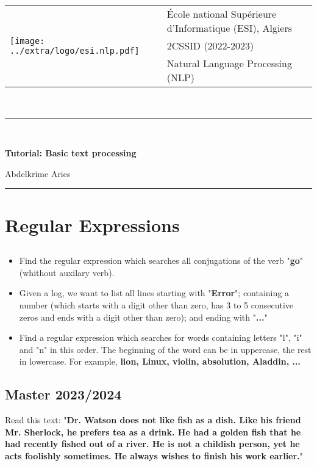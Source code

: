 \documentclass[11pt, a4paper]{article}
\begin{document}

\noindent
\begin{tabular}{ll}
\multirow{3}{*}{\texttt{[image: ../extra/logo/esi.nlp.pdf]}} & 
\'Ecole national Supérieure d'Informatique (ESI), Algiers\\
& 2CSSID (2022-2023)\\
& Natural Language Processing (NLP)
\end{tabular}\\[.25cm]
\noindent\rule{\textwidth}{2pt}\\[-0.5cm]
\begin{center}
{\LARGE \textbf{Tutorial: Basic text processing}}
\begin{flushright}
	Abdelkrime Aries
\end{flushright}
\end{center}\vspace{-0.5cm}
\noindent\rule{\textwidth}{2pt}

\section{Regular Expressions}

\subsection{}

\begin{itemize}
	\item Find the regular expression which searches all conjugations of the verb "\textbf{go}" (whithout auxilary verb). 
	\item Given a log, we want to list all lines starting with "\textbf{Error}"; containing a number (which starts with a digit other than zero, has 3 to 5 consecutive zeros and ends with a digit other than zero); and ending with "\textbf{...}"
	\item Find a regular expression which searches for words containing letters "l", "i" and "n" in this order. The beginning of the word can be in uppercase, the rest in lowercase. For example, \textbf{lion, Linux, violin, absolution, Aladdin, ...}
\end{itemize}

\subsection{Master 2023/2024}

Read this text: "\textbf{Dr. Watson does not like fish as a dish. Like his friend Mr. Sherlock, he prefers tea as a drink. He had a golden fish that he had recently fished out of a river.  He is not a childish person, yet he acts foolishly sometimes. He always wishes to finish his work earlier.}"
\end{document}
